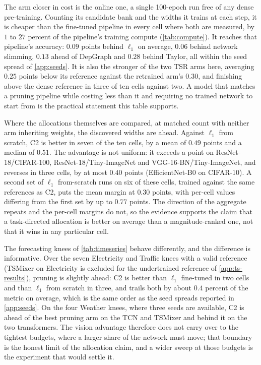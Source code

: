\documentclass[10pt]{article}
\theoremstyle{paper}
\begin{document}
The arm closer in cost is the online one, a single 100-epoch run free of any dense pre-training.
Counting its candidate bank and the widths it trains at each step, it is cheaper than the
fine-tuned pipeline in every cell where both are measured, by $1$ to $27$ percent of the
pipeline's training compute (\cref{tab:compute}). It reaches that
pipeline's accuracy: $0.09$ points behind $\ell_1$ on average, $0.06$ behind network slimming,
$0.13$ ahead of DepGraph and $0.28$ behind Taylor, all within the seed spread of
\cref{app:seeds}. It is also the stronger of the two TSR arms here, averaging $0.25$ points below
its reference against the retrained arm's $0.30$, and finishing above the dense reference in three
of ten cells against two. A model that matches a pruning pipeline while costing less than it
and requiring no trained network to start from is the practical statement this table supports.

Where the allocations themselves are compared, at matched count with neither arm inheriting
weights, the discovered widths are ahead. Against $\ell_1$ from scratch, C2 is better in seven of
the ten cells, by a mean of $0.49$ points and a median of $0.51$. The advantage is not uniform:
it exceeds a point on ResNet-18/CIFAR-100, ResNet-18/Tiny-ImageNet and VGG-16-BN/Tiny-ImageNet,
and reverses in three cells, by at most $0.40$ points (EfficientNet-B0 on CIFAR-10). A second set
of $\ell_1$ from-scratch runs on six of these cells, trained against the same references as C2,
puts the mean margin at $0.30$ points, with per-cell values differing from the first set by up to
$0.77$ points. The direction of the aggregate repeats and the per-cell margins do not, so the
evidence supports the claim that a task-directed allocation is better on average than a
magnitude-ranked one, not that it wins in any particular cell.

The forecasting knees of \cref{tab:timeseries} behave differently, and the difference is
informative. Over the seven Electricity and Traffic knees with a valid reference (TSMixer on
Electricity is excluded for the undertrained reference of \cref{app:ts-results}), pruning is
slightly ahead: C2 is better than $\ell_1$ fine-tuned in two cells and than $\ell_1$ from scratch in
three, and trails both by about $0.4$ percent of the metric on average, which is the same order as
the seed spreads reported in \cref{app:seeds}. On the four Weather knees, where three seeds are available,
C2 is ahead of the best pruning arm on the TCN and TSMixer and behind it on the two
transformers. The vision advantage therefore does not carry
over to the tightest budgets, where a larger share of the network must move; that boundary is the
honest limit of the allocation claim, and a wider sweep at those budgets is the experiment that
would settle it.
\end{document}
